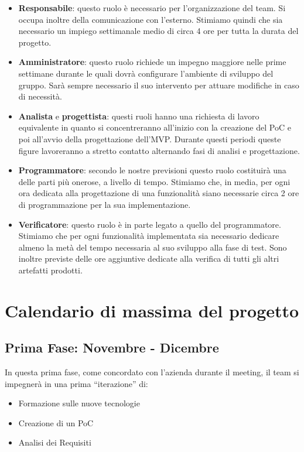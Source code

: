 \documentclass{TWDocumentNoVersion}
\begin{document}
    \begin{itemize}
        \item{\textbf{Responsabile}: questo ruolo è necessario per l'organizzazione del team. Si occupa inoltre della comunicazione con l'esterno. Stimiamo quindi che sia necessario un impiego settimanale medio di circa 4 ore per tutta la durata del progetto.}
        \item{\textbf{Amministratore}: questo ruolo richiede un impegno maggiore nelle prime settimane durante le quali dovrà configurare l'ambiente di sviluppo del gruppo. Sarà sempre necessario il suo intervento per attuare modifiche in caso di necessità.}
        \item{\textbf{Analista} e \textbf{progettista}: questi ruoli hanno una richiesta di lavoro equivalente in quanto si concentreranno all'inizio con la creazione del PoC e poi all'avvio della progettazione dell'MVP. Durante questi periodi queste figure lavoreranno a stretto contatto alternando fasi di analisi e progettazione.}
        \item{\textbf{Programmatore}: secondo le nostre previsioni questo ruolo costituirà una delle parti più onerose, a livello di tempo. Stimiamo che, in media, per ogni ora dedicata alla progettazione di una funzionalità siano necessarie circa 2 ore di programmazione per la sua implementazione.}
        \item{\textbf{Verificatore}: questo ruolo è in parte legato a quello del programmatore. Stimiamo che per ogni funzionalità implementata sia necessario dedicare almeno la metà del tempo necessaria al suo sviluppo alla fase di test. Sono inoltre previste delle ore aggiuntive dedicate alla verifica di tutti gli altri artefatti prodotti.}
    \end{itemize}

    \section*{Calendario di massima del progetto}
        \subsection*{Prima Fase: Novembre - Dicembre}
        {In questa prima fase, come concordato con l'azienda durante il meeting, il team si impegnerà in una prima “iterazione” di:}
            \begin{itemize}
                \item Formazione sulle nuove tecnologie
                \item Creazione di un PoC
                \item Analisi dei Requisiti
            \end{itemize}
\end{document}
